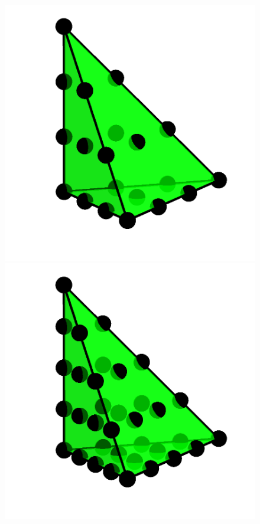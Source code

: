 \begin{figure}
{   \includegraphics[width=\threefigsfull]{chapters/kirby-6/png/CG3_3d.png} \\
   \includegraphics[width=\threefigsfull]{chapters/kirby-6/png/CG4_3d.png}
}
\end{figure}
